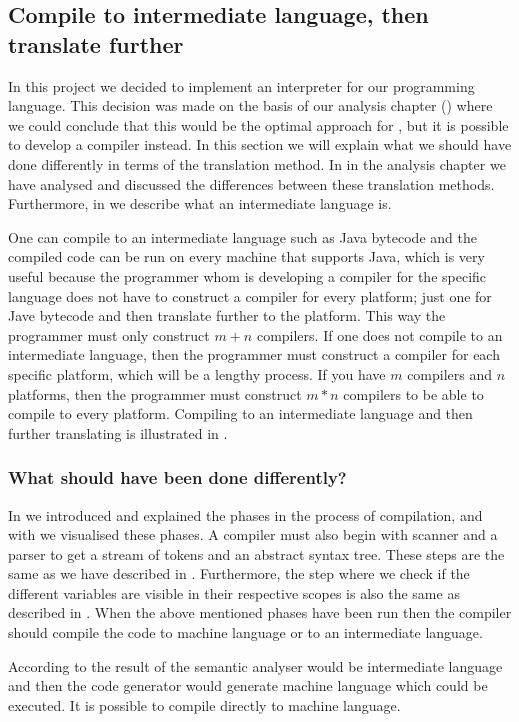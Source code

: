 \subsection{Compile to intermediate language, then translate further}
\label{sec:compiletointermediate}

In this project we decided to implement an interpreter for our programming
language. This decision was made on the basis of our analysis chapter
() where we could conclude that this would be the optimal
approach for \productname{}, but it is possible to develop a compiler instead. In
this section we will explain what we should have done differently in terms of
the translation method. In  in the
analysis chapter we have analysed and discussed the differences between these
translation methods. Furthermore, in  we
describe what an intermediate language is.

One can compile to an intermediate language such as Java bytecode and the
compiled code can be run on every machine that supports Java, which is very
useful because the programmer whom is developing a compiler for the specific
language does not have to construct a compiler for every platform; just one for
Jave bytecode and then translate further to the platform. This way the
programmer must only construct $m+n$ compilers. If one does not compile to an
intermediate language, then the programmer must construct a compiler for each
specific platform, which will be a lengthy process. If you have $m$ compilers
and $n$ platforms, then the programmer must construct $m*n$ compilers to be able
to compile to every platform.  Compiling to an intermediate language and then
further translating is illustrated in .



\subsubsection{What should have been done differently?}

In  we introduced and explained the phases in the
process of compilation, and with  we visualised
these phases. A compiler must also begin with scanner and a parser to get a
stream of tokens and an abstract syntax tree. These steps are the same as we
have described in . Furthermore, the step where we
check if the different variables are visible in their respective scopes is also
the same as described in . When the above mentioned
phases have been run then the compiler should compile the code to machine
language or to an intermediate language. 

According to  the result of the semantic analyser
would be intermediate language and then the code generator would generate
machine language which could be executed. It is possible to compile directly to
machine language.

